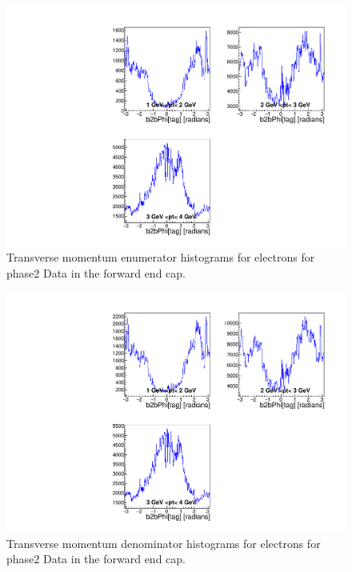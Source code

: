\documentclass[a4paper,11pt,twosided,final,german,openbib,pdftex,listof=totoc,bibliography=totoc]{scrbook}
\begin{document}
\begin{appendix}
\begin{figure}[!htbp]
	\centering
	\includegraphics[width=\textwidth]{Plots/master/xPtMPhiemFCE_Data}
	\caption[Transverse Momentum $\phi$ Electron Forward End Cap Enumerator Histogram Phase2 Data]{Transverse momentum enumerator histograms for electrons for phase2 Data in the forward end cap.}
	\label{plt:PtMPhiemFCE_Data}
\end{figure}

\begin{figure}[!htbp]
	\centering
	\includegraphics[width=\textwidth]{Plots/master/xPtMPhiemFCD_Data}
	\caption[Transverse Momentum $\phi$ Electron Forward End Cap Denominator Histogram Phase2 Data]{Transverse momentum denominator histograms for electrons for phase2 Data in the forward end cap.}
	\label{plt:PtMPhiemFCD_Data}
\end{figure}





\end{appendix}
\end{document}

